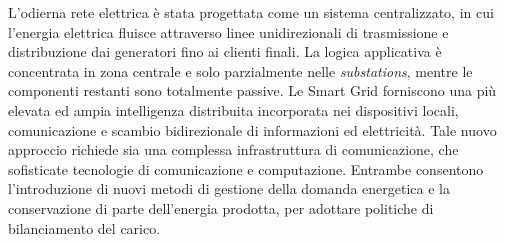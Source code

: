 L'odierna rete elettrica è stata progettata come un sistema centralizzato, in cui l'energia elettrica fluisce attraverso linee unidirezionali di trasmissione e distribuzione dai generatori fino ai clienti finali. La logica applicativa è concentrata in zona centrale e solo parzialmente nelle \emph{substations}, mentre le componenti restanti sono totalmente passive. Le Smart Grid forniscono una più elevata ed ampia intelligenza distribuita incorporata nei dispositivi locali, comunicazione e scambio bidirezionale di informazioni ed elettricità.
Tale nuovo approccio richiede sia una complessa infrastruttura di comunicazione, che sofisticate tecnologie di comunicazione e computazione. Entrambe consentono l'introduzione di nuovi metodi di gestione della domanda energetica e la conservazione di parte dell'energia prodotta, per adottare politiche di bilanciamento del carico.      


